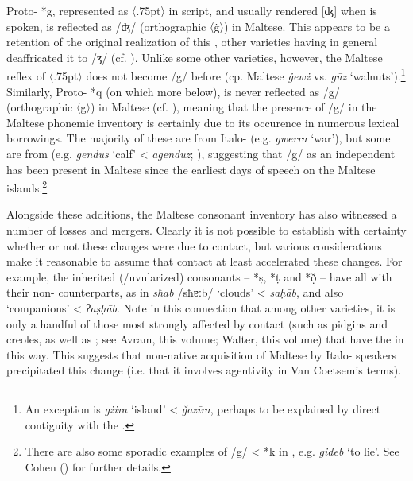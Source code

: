 \documentclass[output=paper]{langsci/langscibook}
\begin{document}
Proto- *g, represented as 〈\kern .75pt{}〉 in  script, and usually rendered [ʤ] when   is spoken, is reflected as /ʤ/ (orthographic 〈ġ〉) in Maltese. This appears to be a retention of the original  realization of this , other  varieties having in general deaffricated it to /ʒ/ (cf. \citealt[136]{Heath2002}). Unlike some other  varieties, however, the Maltese reflex of 〈\kern .75pt{}〉 does not become /g/ before  (cp. Maltese \textit{ġewż} vs.  \textit{gūz} `walnuts').\footnote{An exception is \textit{gżira} `island' <  \textit{ǧaz\={i}ra}, perhaps to be explained by direct contiguity with the .} Similarly, Proto- *q (on which more below), is never reflected as /g/ (orthographic 〈g〉) in Maltese (cf. \citealt[99]{Vanhove1998}), meaning that the presence of /g/ in the Maltese phonemic inventory is certainly due to its occurence in numerous lexical borrowings. The majority of these are from Italo- (e.g. \textit{gwerra} `war'), but some are from  (e.g. \textit{gendus} `calf' <  \textit{agenduz}; \citealt[827]{naitzerrad2002}), suggesting that /g/ as an independent  has been present in Maltese since the earliest days of  speech on the Maltese islands.\footnote{There are also some sporadic examples of /g/ < *k in  , e.g. \textit{gideb} `to lie'. See Cohen (\citeyear[14--15]{cohen1966}) for further details.}


 \label{mergers}
Alongside these additions, the Maltese consonant  inventory has also witnessed a number of losses and mergers. Clearly it is not possible to establish with certainty whether or not these changes were due to contact, but various considerations make it reasonable to assume that contact at least accelerated these changes. For example, the inherited  (/uvularized) consonants -- *\d{s}, *\d{t} and *\d{ð} -- have all  with their non- counterparts, as in \textit{sħab} /sħɐːb/ `clouds' < \textit{sa\d{h}\={a}b}, and also `companions' < \textit{ʔa\d{s}\d{h}\={a}b}. Note in this connection that among other  varieties, it is only a handful of those most strongly affected by contact (such as pidgins and creoles, as well as  ; see Avram, this volume; Walter, this volume) that have  the  in this way. This suggests that non-native acquisition of Maltese by Italo- speakers precipitated this change (i.e. that it involves  agentivity in Van Coetsem's \citeyear{VanCoetsem1988,VanCoetsem2000} terms).
\end{document}
